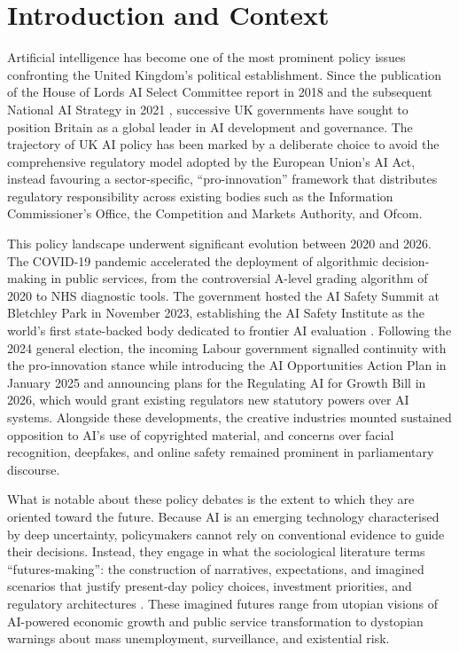 \chapter{Introduction and Context}

Artificial intelligence has become one of the most prominent policy issues confronting the United Kingdom's political establishment. Since the publication of the House of Lords AI Select Committee report in 2018 \parencite{hol2018} and the subsequent National AI Strategy in 2021 \parencite{hmgov2021}, successive UK governments have sought to position Britain as a global leader in AI development and governance. The trajectory of UK AI policy has been marked by a deliberate choice to avoid the comprehensive regulatory model adopted by the European Union's AI Act, instead favouring a sector-specific, ``pro-innovation'' framework that distributes regulatory responsibility across existing bodies such as the Information Commissioner's Office, the Competition and Markets Authority, and Ofcom.

This policy landscape underwent significant evolution between 2020 and 2026. The COVID-19 pandemic accelerated the deployment of algorithmic decision-making in public services, from the controversial A-level grading algorithm of 2020 to NHS diagnostic tools. The government hosted the AI Safety Summit at Bletchley Park in November 2023, establishing the AI Safety Institute as the world's first state-backed body dedicated to frontier AI evaluation \parencite{hmgov2023}. Following the 2024 general election, the incoming Labour government signalled continuity with the pro-innovation stance while introducing the AI Opportunities Action Plan in January 2025 \parencite{hmgov2025} and announcing plans for the Regulating AI for Growth Bill in 2026, which would grant existing regulators new statutory powers over AI systems. Alongside these developments, the creative industries mounted sustained opposition to AI's use of copyrighted material, and concerns over facial recognition, deepfakes, and online safety remained prominent in parliamentary discourse.

What is notable about these policy debates is the extent to which they are oriented toward the future. Because AI is an emerging technology characterised by deep uncertainty, policymakers cannot rely on conventional evidence to guide their decisions. Instead, they engage in what the sociological literature terms ``futures-making'': the construction of narratives, expectations, and imagined scenarios that justify present-day policy choices, investment priorities, and regulatory architectures \parencite{beckert2013}. These imagined futures range from utopian visions of AI-powered economic growth and public service transformation to dystopian warnings about mass unemployment, surveillance, and existential risk.

